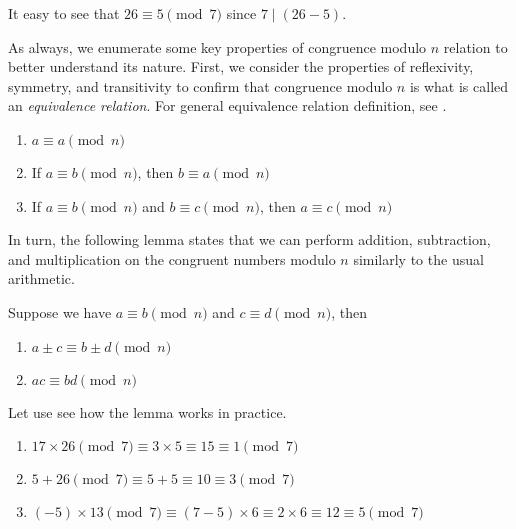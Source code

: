 \documentclass[../lecture-notes-148x210.tex]{subfiles}
\begin{document}
\begin{example}
    It easy to see that $26 \equiv 5 \pmod{7}$ since $7 \mid (26-5)$. 
\end{example}

As always, we enumerate some key properties of congruence modulo $n$ relation to 
better understand its nature. First, we consider the properties of reflexivity,
symmetry, and transitivity to confirm that congruence modulo $n$ is what 
is called an \textit{equivalence relation}. For general 
equivalence relation definition, see .

\begin{lemma} 
    \hfill
    \begin{enumerate}
        \item $a \equiv a \pmod{n}$
        \item If $a \equiv b \pmod{n}$, then $b \equiv a \pmod{n}$
        \item If $a \equiv b \pmod{n}$ and $b \equiv c \pmod{n}$, then $a \equiv c \pmod{n}$
    \end{enumerate}
\end{lemma}

In turn, the following lemma states that we can perform addition, subtraction,
and multiplication on the congruent numbers modulo $n$ similarly to the usual
arithmetic.

\begin{lemma}
    Suppose we have $a \equiv b \pmod{n}$ and $c \equiv d \pmod{n}$, then 
        \begin{enumerate}
            \item $a \pm c \equiv b \pm d \pmod{n}$
            \item $ac \equiv bd \pmod{n}$
        \end{enumerate}
\end{lemma}

\begin{example}
    Let use see how the lemma works in practice.
    \begin{enumerate}
        \item $17 \times 26 \pmod{7} \equiv 3 \times 5 \equiv 15 \equiv 1 \pmod{7}$
        \item $5 + 26 \pmod{7} \equiv 5 + 5 \equiv 10 \equiv 3 \pmod{7}$
        \item $(-5) \times 13 \pmod{7} \equiv (7-5) \times 6 \equiv 2 \times 6 \equiv 12 \equiv 5 \pmod{7}$
    \end{enumerate}
\end{example}
\end{document}
